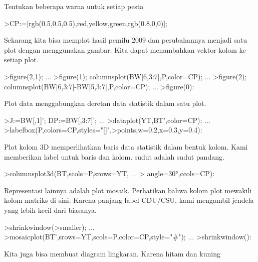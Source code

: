 \documentclass[a4paper,10pt]{article}
\begin{document}
\begin{eulernotebook}
\begin{eulercomment}
\begin{eulercomment}
\begin{eulercomment}
Tentukan beberapa warna untuk setiap pesta
\end{eulercomment}
\begin{eulerprompt}
>CP:=[rgb(0.5,0.5,0.5),red,yellow,green,rgb(0.8,0,0)];
\end{eulerprompt}
\begin{eulercomment}
Sekarang kita bisa memplot hasil pemilu 2009 dan perubahannya menjadi
satu plot dengan menggunakan gambar. Kita dapat menambahkan vektor
kolom ke setiap plot.
\end{eulercomment}
\begin{eulerprompt}
>figure(2,1);  ...
>figure(1); columnsplot(BW[6,3:7],P,color=CP); ...
>figure(2); columnsplot(BW[6,3:7]-BW[5,3:7],P,color=CP);  ...
>figure(0):
\end{eulerprompt}
\begin{eulercomment}
Plot data menggabungkan deretan data statistik dalam satu plot.
\end{eulercomment}
\begin{eulerprompt}
>J:=BW[,1]'; DP:=BW[,3:7]'; ...
>dataplot(YT,BT',color=CP);  ...
>labelbox(P,colors=CP,styles="[]",>points,w=0.2,x=0.3,y=0.4):
\end{eulerprompt}
\begin{eulercomment}
Plot kolom 3D memperlihatkan baris data statistik dalam bentuk kolom.
Kami memberikan label untuk baris dan kolom. sudut adalah sudut
pandang.
\end{eulercomment}
\begin{eulerprompt}
>columnsplot3d(BT,scols=P,srows=YT, ...
>  angle=30°,ccols=CP):
\end{eulerprompt}
\begin{eulercomment}
Representasi lainnya adalah plot mosaik. Perhatikan bahwa kolom plot
mewakili kolom matriks di sini. Karena panjang label CDU/CSU, kami
mengambil jendela yang lebih kecil dari biasanya.
\end{eulercomment}
\begin{eulerprompt}
>shrinkwindow(>smaller);  ...
>mosaicplot(BT',srows=YT,scols=P,color=CP,style="#"); ...
>shrinkwindow():
\end{eulerprompt}
\begin{eulercomment}
Kita juga bisa membuat diagram lingkaran. Karena hitam dan kuning

\end{eulercomment}
\end{eulercomment}
\end{eulercomment}
\end{eulernotebook}
\end{document}
